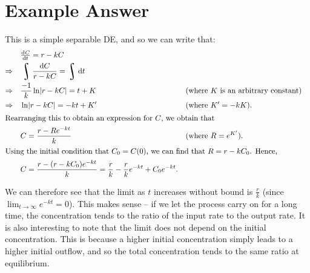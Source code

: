 \documentclass[a4paper]{article}
\DeclareMathOperator*{\rint}{\scalerel*{\rotatebox{17}{$\!\int\!$}}{\int}}
\begin{document}
\section{Example Answer}
This is a simple separable DE, and so we can write that:
\begin{align*}
                   & \od{C}{t} = r - kC \\
  \Rightarrow\quad & \rint \frac{\dif{C}}{r - kC} = \rint \dif{t} \\
  \Rightarrow\quad & \frac{-1}{k} \ln{\abs{r - kC}} = t + K && \text{(where $ K $ is an arbitrary constant)}\\
  \Rightarrow\quad & \ln{\abs{r - kC}} = -kt + K'           && \text{(where $ K' = -kK $).}\\
  \intertext{Rearranging this to obtain an expression for $ C $, we obtain that}
                   & C = \frac{r - Re^{-kt}}{k} && \text{(where $ R = e^{K'} $).}\\
  \intertext{Using the initial condition that $ C_0 = C(0) $, we can find that $ R = r - kC_0 $. Hence,}
                   & C = \frac{r - (r - kC_0)e^{-kt}}{k} = \frac{r}{k} - \frac{r}{k} e^{-kt} + C_0 e^{-kt}.
\end{align*}

We can therefore see that the limit as $ t $ increases without bound is $ \frac{r}{k} $ (since $ \lim_{t\to\infty} e^{-kt} = 0 $).
This makes sense -- if we let the process carry on for a long time, the concentration tends to the ratio of the input rate
to the output rate. It is also interesting to note that the limit does not depend on the initial concentration. This is because
a higher initial concentration simply leads to a higher initial outflow, and so the total concentration tends to the same ratio at
equilibrium.
\end{document}
